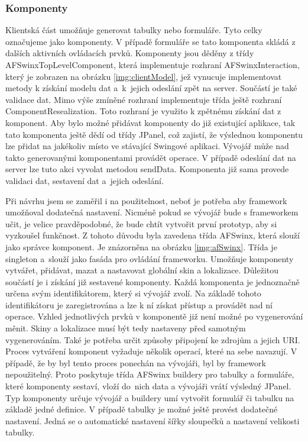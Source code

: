 \subsubsection{Komponenty}
Klientská část umožňuje generovat tabulky nebo formuláře. Tyto celky označujeme jako komponenty. V případě formuláře se tato komponenta skládá z dalších aktivních ovládacích prvků. Komponenty jsou děděny z třídy AFSwinxTopLevelComponent, která implementuje rozhraní AFSwinxInteraction, který je zobrazen na obrázku \ref{img:clientModel}, jež vynucuje implementovat metody k získání modelu dat a~k~jejich odeslání zpět na server. Součástí je také validace dat. Mimo výše zmíněné rozhraní implementuje třída ještě rozhraní ComponentResealization. Toto rozhraní je využito k zpětnému získání dat z komponent. Aby bylo možné přidávat komponenty do již existující aplikace, tak tato komponenta ještě dědí od třídy JPanel, což zajistí, že výslednou komponentu lze přidat na jakékoliv místo ve stávající Swingové aplikaci. Vývojář může nad takto generovanými komponentami provádět operace. V případě odeslání dat na server lze tuto akci vyvolat metodou sendData. Komponenta již sama provede validaci dat, sestavení dat a~jejich odeslání.

Při návrhu jsem se zaměřil i na použitelnost, neboť je potřeba aby framework umožňoval dodatečná nastavení. Nicméně pokud se vývojář bude s frameworkem učit, je velice pravděpodobné, že bude chtít vytvořit první prototyp, aby si vyzkoušel funkčnost. Z tohoto důvodu byla zavedena třída AFSwinx, která slouží jako správce komponent. Je znázorněna na obrázku \ref{img:afSwinx}. Třída je singleton \cite{gamma} a~slouží jako fasáda \cite{gamma}pro ovládání frameworku.  Umožňuje komponenty vytvářet, přidávat, mazat a nastavovat globální skin a lokalizace. Důležitou součástí je i získání již sestavené komponenty. Každá komponenta je jednoznačně určena svým identifikátorem, který si vývojář zvolí. Na základě tohoto identifikátoru je zaregistrována a lze k ní získat přístup a provádět nad ní operace. Vzhled jednotlivých prvků v komponentě již není možné po vygenerování měnit. Skiny a lokalizace musí být tedy nastaveny před samotným vygenerováním. Také je potřeba určit způsoby připojení ke zdrojům a jejich URI. Proces vytváření komponent vyžaduje několik operací, které na sebe navazují. V případě, že by byl tento proces ponechán na vývojáři, byl by framework nepoužitelný. Proto poskytuje třída AFSwinx buildery \cite{gamma} pro tabulky a formuláře, které komponenty sestaví, vloží do~nich data a vývojáři vrátí výsledný JPanel. Typ komponenty určuje vývojář a buildery umí vytvořit formulář či tabulku na základě jedné definice. V případě tabulky je možné ještě provést dodatečné nastavení. Jedná se o automatické nastavení šířky sloupečků a nastavení velikosti tabulky.

